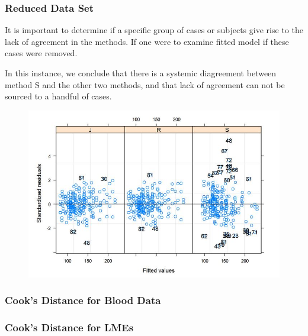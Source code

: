\documentclass[12pt, a4paper]{report}
\theoremstyle{plain}
\theoremstyle{definition}
\theoremstyle{remark}
\begin{document}
	\subsubsection{Reduced Data Set}
	It is important to determine if a specific group of cases or subjects give rise to the lack of agreement in the methods. If one were to examine fitted model if these cases were removed.
	
	
	In this instance, we conclude that there is a systemic diagreement between method S and the other two methods, and that lack of agreement can not be sourced to a handful of cases.
	\begin{figure}[h!]
		\centering
		\includegraphics[width=0.7\linewidth]{images/bloodnlmeResidPlot2B}
	\end{figure}
	

	
	
	
	
	
	
	
	
	\subsubsection{Cook's Distance for Blood Data}
	


	
	

	
	\subsubsection{Cook's Distance for LMEs} %
\end{document}
